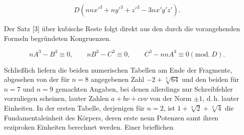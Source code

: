 \[
D(nnx'^3+ny'^3+z'^3-3nx'y'z').
\]

Der Satz [3] über kubische Reste folgt direkt aus den durch die
vorangehenden Formeln begründeten Kongruenzen.

\[
nA^3-B^3 \equiv 0, \qquad nB^3-C^3 \equiv 0, \qquad C^3-nnA^3 \equiv 0 (\mathrm{mod.}\ D).
\]

Schließlich liefern die beiden numerischen Tabellen am Ende der Fragmente,
abgesehen von der für $n=8$ angegebenen Zahl $-2+\sqrt[3]{64}$ und den beiden
für $n=7$ und $n=9$ gemachten Angaben, bei denen allerdings nur Schreibfehler
vorzuliegen scheinen, lauter Zahlen $a+b\nu+c\nu\nu$ von der Norm $\pm 1$,
d.\,h. lauter Einheiten. In der ersten Tabelle, derjenigen für $n=2$, ist
$1+\sqrt[3]{2}+\sqrt[3]{4}$ die Fundamentaleinheit des Körpers, deren erste
neun Potenzen samt ihren reziproken Einheiten berechnet werden. Einer
brieflichen%
